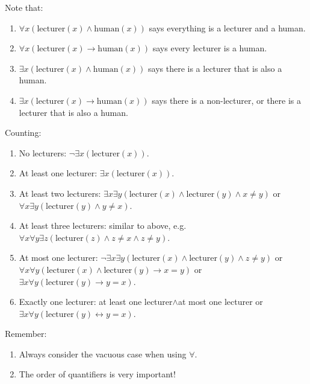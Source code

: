 \documentclass[10pt,twoside,twocolumn]{article}
\begin{document}
Note that:
\begin{enumerate}
\item $\forall x\left(\mbox{lecturer}\left(x\right)\land\mbox{human}\left(x\right)\right)$
says everything is a lecturer and a human.
\item $\forall x\left(\mbox{lecturer}\left(x\right)\rightarrow\mbox{human}\left(x\right)\right)$
says every lecturer is a human.
\item $\exists x\left(\mbox{lecturer}\left(x\right)\land\mbox{human}\left(x\right)\right)$
says there is a lecturer that is also a human.
\item $\exists x\left(\mbox{lecturer}\left(x\right)\rightarrow\mbox{human}\left(x\right)\right)$
says there is a non-lecturer, or there is a lecturer that is also
a human.
\end{enumerate}
Counting:
\begin{enumerate}
\item No lecturers: $\lnot\exists x\left(\mbox{lecturer}\left(x\right)\right)$.
\item At least one lecturer: $\exists x\left(\mbox{lecturer}\left(x\right)\right)$.
\item At least two lecturers: $\exists x\exists y\left(\mbox{lecturer}\left(x\right)\land\mbox{lecturer}\left(y\right)\land x\neq y\right)$
or $\forall x\exists y\left(\mbox{lecturer}\left(y\right)\land y\neq x\right)$.
\item At least three lecturers: similar to above, e.g. $\forall x\forall y\exists z\left(\mbox{lecturer}\left(z\right)\land z\neq x\land z\neq y\right)$.
\item At most one lecturer: $\lnot\exists x\exists y\left(\mbox{lecturer}\left(x\right)\land\mbox{lecturer}\left(y\right)\land z\neq y\right)$
or $\forall x\forall y\left(\mbox{lecturer}\left(x\right)\land\mbox{lecturer}\left(y\right)\rightarrow x=y\right)$
or $\exists x\forall y\left(\mbox{lecturer}\left(y\right)\rightarrow y=x\right)$.
\item Exactly one lecturer: at least one lecturer$\land$at most one lecturer
or $\exists x\forall y\left(\mbox{lecturer}\left(y\right)\leftrightarrow y=x\right)$.
\end{enumerate}
Remember:
\begin{enumerate}
\item Always consider the vacuous case when using $\forall$.
\item The order of quantifiers is very important!
\end{enumerate}
\end{document}
